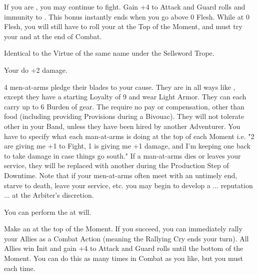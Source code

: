 \begin{multicols*}{2}


If you are , you may continue to fight.  Gain +4 to Attack and Guard rolls and immunity to .  This bonus instantly ends when you go above 0 Flesh.  While at 0 Flesh, you will still have to roll your \DEATH at the Top of the Moment, and must try your \INSANITY and \INJURY at the end of Combat.


Identical to the Virtue of the same name under the Sellsword Trope.


Your  do +2 damage. 


4 men-at-arms pledge their blades to your cause. They are  in all ways like , except they have a starting Loyalty of 9 and wear Light Armor. They can each carry up to 6 Burden of gear. The require no pay or compensation, other than food (including providing Provisions during a Bivouac). They will not tolerate other  in your Band, unless they have been hired by another Adventurer. You have to specify what each man-at-arms is doing at the top of each Moment i.e. "2 are giving me +1 to Fight, 1 is giving me +1 damage, and I'm keeping one back to take damage in case things go south."  If a man-at-arms dies or leaves your service, they will be replaced with another during the Production Step of Downtime. Note that if your men-at-arms often meet with an untimely end, starve to death, leave your service, etc. you may begin to develop a ... reputation ... at the Arbiter's discretion.


You can perform the  at will.


Make an \RSTRY{\PRE} at the top of the Moment. If you succeed, you can immediately rally your Allies as a Combat Action (meaning the Rallying Cry ends your turn).  All Allies win Init and gain +4 to Attack and Guard rolls until the bottom of the Moment. You can do this as many times in Combat as you like, but you must \RSTRY{\PRE} each time. 


\end{multicols*}
